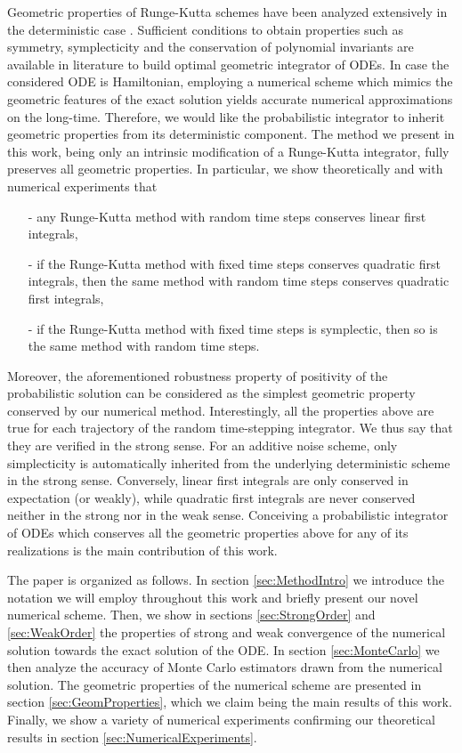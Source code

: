 \documentclass{siamart1116}
\numberwithin{theorem}{section}
\newcommand{\corr}[1]{{\color{bordeaux}#1}}
\begin{document}
Geometric properties of Runge-Kutta schemes have been analyzed extensively in the deterministic case \cite{HLW06}. Sufficient conditions to obtain properties such as symmetry, symplecticity and the conservation of polynomial invariants are available in literature to build optimal geometric integrator of ODEs. In case the considered ODE is Hamiltonian, employing a numerical scheme which mimics the geometric features of the exact solution yields accurate numerical approximations on the long-time. Therefore, we would like the probabilistic integrator to inherit geometric properties from its deterministic component. The method we present in this work, being only an intrinsic modification of a Runge-Kutta integrator, fully preserves all geometric properties. In particular, we show theoretically and with numerical experiments that
\begin{itemize}
	\item[-] any Runge-Kutta method with random time steps conserves linear first integrals,
	\item[-] if the Runge-Kutta method with fixed time steps conserves quadratic first integrals, then the same method with random time steps conserves quadratic first integrals,
	\item[-] if the Runge-Kutta method with fixed time steps is symplectic, then so is the same method with random time steps.
\end{itemize}
\corr{Moreover, the aforementioned robustness property of positivity of the probabilistic solution can be considered as the simplest geometric property conserved by our numerical method.} Interestingly, all the properties above are true for each trajectory of the random time-stepping integrator. We thus say that they are verified in the strong sense. For an additive noise scheme, only simplecticity is automatically inherited from the underlying deterministic scheme in the strong sense. Conversely, linear first integrals are only conserved in expectation (or weakly), while quadratic first integrals are never conserved neither in the strong nor in the weak sense. Conceiving a probabilistic integrator of ODEs which conserves all the geometric properties above for any of its realizations is the main contribution of this work.



The paper is organized as follows. In section \ref{sec:MethodIntro} we introduce the notation we will employ throughout this work and briefly present our novel numerical scheme. Then, we show in sections \ref{sec:StrongOrder} and \ref{sec:WeakOrder} the properties of strong and weak convergence of the numerical solution towards the exact solution of the ODE. In section \ref{sec:MonteCarlo} we then analyze the accuracy of Monte Carlo estimators drawn from the numerical solution. The geometric properties of the numerical scheme are presented in section \ref{sec:GeomProperties}, which we claim being the main results of this work. Finally, we show a variety of numerical experiments confirming our theoretical results in section \ref{sec:NumericalExperiments}.
\end{document}

